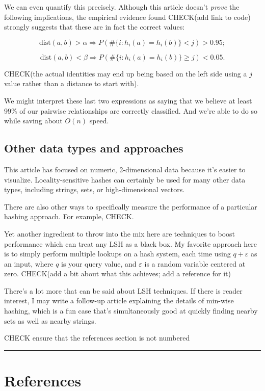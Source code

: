 \documentclass[20pt,]{extarticle}
\begin{document}
We can even quantify this precisely. Although this article doesn't
\emph{prove} the following implications, the empirical evidence found
CHECK(add link to code) strongly suggests that these are in fact the
correct values:

\[ \text{dist}(a, b) > \alpha \Rightarrow P(\#\{i : h_i(a) = h_i(b)\} < j) > 0.95; \]

\[ \text{dist}(a, b) < \beta  \Rightarrow P(\#\{i : h_i(a) = h_i(b)\} \ge j) < 0.05. \]

CHECK(the actual identities may end up being based on the left side
using a \(j\) value rather than a distance to start with).

We might interpret these last two expressions as saying that we believe
at least 99\% of our pairwise relationships are correctly classified.
And we're able to do so while saving about \(O(n)\) speed.

\subsection{Other data types and
approaches}\label{other-data-types-and-approaches}

This article has focused on numeric, 2-dimensional data because it's
easier to visualize. Locality-sensitive hashes can certainly be used for
many other data types, including strings, sets, or high-dimensional
vectors.

There are also other ways to specifically measure the performance of a
particular hashing approach. For example, CHECK.

Yet another ingredient to throw into the mix here are techniques to
boost performance which can treat any LSH as a black box. My favorite
approach here is to simply perform multiple lookups on a hash system,
each time using \(q + \varepsilon\) as an input, where \(q\) is your
query value, and \(\varepsilon\) is a random variable centered at zero.
CHECK(add a bit about what this achieves; add a reference for it)

There's a lot more that can be said about LSH techniques. If there is
reader interest, I may write a follow-up article explaining the details
of min-wise hashing, which is a fun case that's simultaneously good at
quickly finding nearby sets as well as nearby strings.

CHECK ensure that the references section is not numbered

\begin{center}\rule{0.5\linewidth}{\linethickness}\end{center}

\section{References}\label{references}
\end{document}
